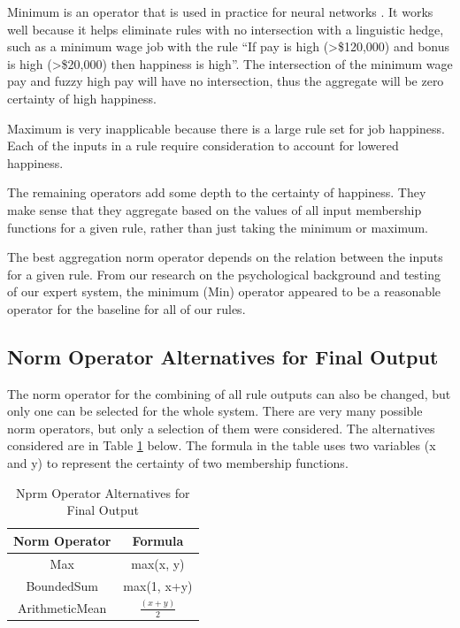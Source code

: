 \documentclass[12pt,fleqn,reqno,letterpaper]{article}
\begin{document}
Minimum is an operator that is used in practice for neural networks \cite{FAKHRI}. It works well because it helps eliminate rules with no intersection with a linguistic hedge, such as a minimum wage job with the rule “If pay is high (>\$120,000) and bonus is high (>\$20,000) then happiness is high”. The intersection of the minimum wage pay and fuzzy high pay will have no intersection, thus the aggregate will be zero certainty of high happiness.

Maximum is very inapplicable because there is a large rule set for job happiness. Each of the inputs in a rule require consideration to account for lowered happiness.

The remaining operators add some depth to the certainty of happiness. They make sense that they aggregate based on the values of all input membership functions for a given rule, rather than just taking the minimum or maximum.

The best aggregation norm operator depends on the relation between the inputs for a given rule. From our research on the psychological background and testing of our expert system, the minimum (Min) operator appeared to be a reasonable operator for the baseline for all of our rules.

\subsection{Norm Operator Alternatives for Final Output}
The norm operator for the combining of all rule outputs can also be changed, but only one can be selected for the whole system. There are very many possible norm operators, but only a selection of them were considered. The alternatives considered are in Table \ref{tbl:FINAL-NORM} below. The formula in the table uses two variables (x and y) to represent the certainty of two membership functions.

\begin{table}[h]
\caption{Nprm Operator Alternatives for Final Output}
\label{tbl:FINAL-NORM}
\centering
\begin{tabular}{|c|c|}
\hline
\textbf{Norm Operator} & \textbf{Formula}  \\ \hline
Max                    & max(x, y)         \\ \hline
BoundedSum             & max(1, x+y)       \\ \hline
ArithmeticMean         & $\frac{(x+y)}{2}$ \\ \hline
\end{tabular}
\end{table}
\end{document}
